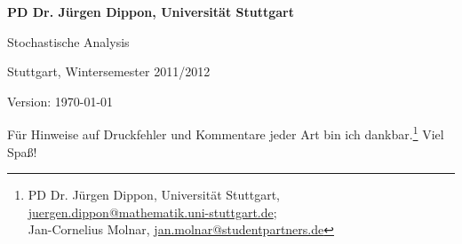 \documentclass[%
	paper=a5,%
	fleqn,%
	DIV=18,%
	BCOR=0mm,
	fontsize=11pt,
	titlepage=false,%
	bibliography=totoc,
	DIV=18,%
	twoside=true,
	pdftitle=Stochastische Analysis,
	pdfauthor=Jürgen Dippon,
	numbers=noendperiod]%
	{scrbook}
\begin{document}
\begin{titlepage}
\bfseries\color{darkgray}
\vspace*{2mm}
\noindent
PD Dr. Jürgen Dippon, Universität Stuttgart

\begin{center}
\vspace*{10mm}
\noindent
{\huge\color{darkblue} Stochastische Analysis}

\vspace*{4mm}

Stuttgart, Wintersemester 2011/2012
\end{center}

\vspace*{\fill}

\begin{flushright}
\small
Version: \today\
\vspace*{5mm}

Für Hinweise auf Druckfehler und Kommentare jeder Art bin ich dankbar.\footnote{\color{darkgray}
PD Dr. Jürgen Dippon, Universität Stuttgart,
\href{mailto:juergen.dippon@mathematik.uni-stuttgart.de}{juergen.dippon@mathematik.uni-stuttgart.de};\\
Jan-Cornelius Molnar,
\href{mailto:jan.molnar@studentpartners.de}{jan.molnar@studentpartners.de}
}
Viel Spaß!
\end{flushright}
\end{titlepage}


\tableofcontents















\clearpage
{}
\printindex


\clearpage
\printnomenclature[2cm]

\nocite{*}




\end{document}
